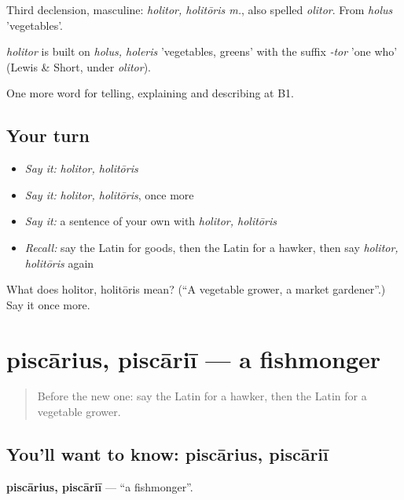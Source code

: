 Third declension, masculine: \emph{holitor, holitōris m.}, also spelled \emph{olitor}. From \emph{holus} 'vegetables'.

\begin{cousinweb}
\emph{holitor} is built on \emph{holus, holeris} 'vegetables, greens' with the suffix \emph{-tor} 'one who' (Lewis \& Short, under \emph{olitor}).
\end{cousinweb}

\begin{grammarlens}[title={What you've built}]
One more word for telling, explaining and describing at B1.
\end{grammarlens}

\subsection*{Your turn}
\begin{itemize}
\raggedright
  \item \emph{Say it:} \emph{holitor, holitōris}
  \item \emph{Say it:} \emph{holitor, holitōris}, once more
  \item \emph{Say it:} a sentence of your own with \emph{holitor, holitōris}
  \item \emph{Recall:} say the Latin for goods, then the Latin for a hawker, then say \emph{holitor, holitōris} again
\end{itemize}

\begin{tcolorbox}[breakable,colback=teal!4,colframe=teal!35!black,title={Before you move on}]
What does holitor, holitōris mean? (\textquotedblleft{}A vegetable grower, a market gardener\textquotedblright{}.) Say it once more.
\end{tcolorbox}
\section[piscārius, piscāriī]{piscārius, piscāriī — a fishmonger}

\label{lesson:LA-C463-piscarius}



\begin{quote}
Before the new one: say the Latin for a hawker, then the Latin for a vegetable grower.
\end{quote}

\subsection*{You'll want to know: piscārius, piscāriī}
\textbf{piscārius, piscāriī} — \textquotedblleft{}a fishmonger\textquotedblright{}.

